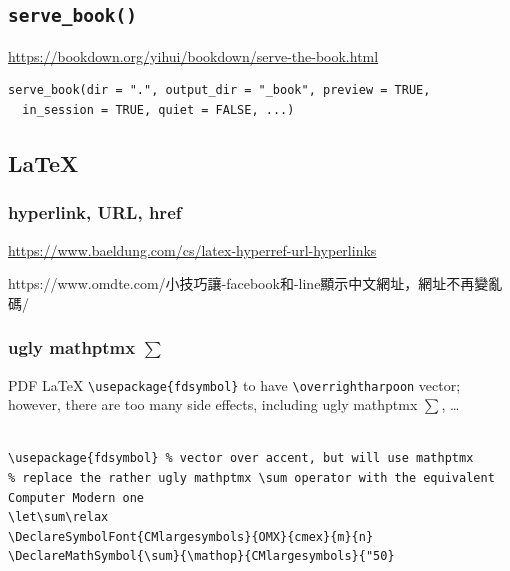 \documentclass[
]{book}
\theoremstyle{definition}
\theoremstyle{definition}
\theoremstyle{definition}
\theoremstyle{definition}
\theoremstyle{remark}
\begin{document}
\hypertarget{serve_book}{%
\subsection{\texorpdfstring{\texttt{serve\_book()}}{serve\_book()}}\label{serve_book}}

\url{https://bookdown.org/yihui/bookdown/serve-the-book.html}

\begin{verbatim}
serve_book(dir = ".", output_dir = "_book", preview = TRUE,
  in_session = TRUE, quiet = FALSE, ...)
\end{verbatim}

\hypertarget{latex-1}{%
\subsection{LaTeX}\label{latex-1}}

\hypertarget{hyperlink-url-href}{%
\subsubsection{hyperlink, URL, href}\label{hyperlink-url-href}}

\url{https://www.baeldung.com/cs/latex-hyperref-url-hyperlinks}

\begin{CJK}{UTF8}{bsmi}
https://www.omdte.com/小技巧讓-facebook和-line顯示中文網址，網址不再變亂碼/
\end{CJK}

\hypertarget{ugly-mathptmx-sum}{%
\subsubsection{\texorpdfstring{ugly mathptmx \(\sum\)}{ugly mathptmx \textbackslash sum}}\label{ugly-mathptmx-sum}}

PDF LaTeX \texttt{\textbackslash{}usepackage\{fdsymbol\}} to have \texttt{\textbackslash{}overrightharpoon} vector; however, there are too many side effects, including ugly mathptmx \(\sum\), \ldots{}

\begin{verbatim}

\usepackage{fdsymbol} % vector over accent, but will use mathptmx
% replace the rather ugly mathptmx \sum operator with the equivalent Computer Modern one
\let\sum\relax
\DeclareSymbolFont{CMlargesymbols}{OMX}{cmex}{m}{n}
\DeclareMathSymbol{\sum}{\mathop}{CMlargesymbols}{"50}
\end{verbatim}
\end{document}
